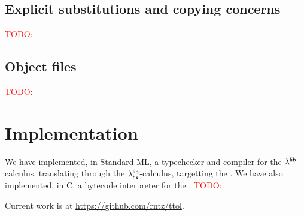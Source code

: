\documentclass[11pt]{article}
\newcommand{\todo}[1]{\textcolor{red}{\small TODO: #1}}
\begin{document}
\subsection{Explicit substitutions and copying concerns}
\label{sec:explsubst}
\todo{}

\subsection{Object files}
\todo{}


\section{Implementation}

We have implemented, in Standard ML, a typechecker and compiler for the
$\lambda^{\textsf{lib}}$-calculus, translating through the $\lambda^{\textsf{lib}}_{\textsf{hs}}$-calculus, targetting the
\camlib{}. We have also implemented, in C, a bytecode interpreter for the
\camlib{}. \todo{}

Current work is at \url{https://github.com/rntz/ttol}.


\newpage


\end{document}
